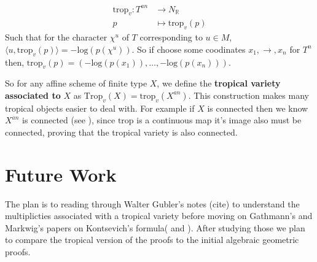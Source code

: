    \begin{align*}
        \text{trop}_v:T^{an} &\to N_{\mathbb{R}}\\
        p &\mapsto \text{trop}_v(p)
    \end{align*}
    Such that for the character $\chi^u$ of $T$ corresponding to $u \in M$, $\langle u,\text{trop}_{v}(p)\rangle = -\text{log}(p(\chi^{u}))$. So if choose some coodinates $x_1, \to, x_n$ for $T^{n}$ then, $\text{trop}_v(p) = (-\text{log}(p(x_1)), \dots, -\text{log}(p(x_n)))$.
    \par So for any affine scheme of finite type $X$, we define the \textbf{tropical variety associated to }$X$ as $\text{Trop}_v(X) = \text{trop}_v(X^{an})$. 
    This construction makes many tropical objects easier to deal with. 
    For example if $X$ is connected then we know $X^{an}$ is connected (see \cite{berkovich2012spectral}), since $\text{trop}$ is a continuous map it's image also must be connected, proving that the tropical variety is also connected.
    \section{Future Work}
    The plan is to reading through Walter Gubler's notes (cite) to understand the multiplicties associated with a tropical variety before moving on Gathmann's and Markwig's papers on Kontsevich's formula(\cite{GathmannMarkwig+2007+155+177} and \cite{GATHMANN2008537}). After studying those we plan to compare the tropical version of the proofs to the initial algebraic geometric proofs.
